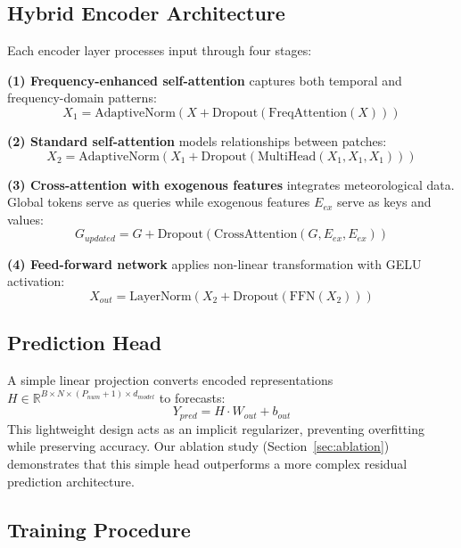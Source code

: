 \documentclass[a4paper,fleqn]{cas-dc}
\begin{document}
\subsection{Hybrid Encoder Architecture}

Each encoder layer processes input through four stages:

\textbf{(1) Frequency-enhanced self-attention} captures both temporal and frequency-domain patterns:
\begin{equation}
X_1 = \text{AdaptiveNorm}(X + \text{Dropout}(\text{FreqAttention}(X)))
\end{equation}

\textbf{(2) Standard self-attention} models relationships between patches:
\begin{equation}
X_2 = \text{AdaptiveNorm}(X_1 + \text{Dropout}(\text{MultiHead}(X_1, X_1, X_1)))
\end{equation}

\textbf{(3) Cross-attention with exogenous features} integrates meteorological data. Global tokens serve as queries while exogenous features $E_{ex}$ serve as keys and values:
\begin{equation}
G_{updated} = G + \text{Dropout}(\text{CrossAttention}(G, E_{ex}, E_{ex}))
\end{equation}

\textbf{(4) Feed-forward network} applies non-linear transformation with GELU activation:
\begin{equation}
X_{out} = \text{LayerNorm}(X_2 + \text{Dropout}(\text{FFN}(X_2)))
\end{equation}

\subsection{Prediction Head}

A simple linear projection converts encoded representations $H \in \mathbb{R}^{B \times N \times (P_{num}+1) \times d_{model}}$ to forecasts:
\begin{equation}
Y_{pred} = H \cdot W_{out} + b_{out}
\end{equation}
This lightweight design acts as an implicit regularizer, preventing overfitting while preserving accuracy. Our ablation study (Section~\ref{sec:ablation}) demonstrates that this simple head outperforms a more complex residual prediction architecture.

\subsection{Training Procedure}
\end{document}
